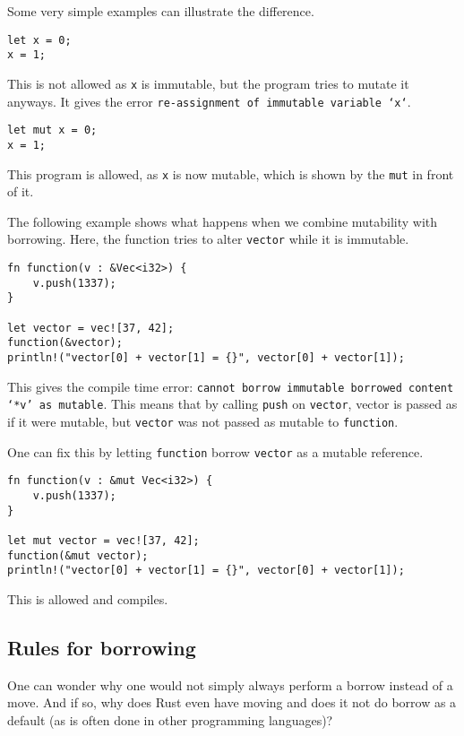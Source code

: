 Some very simple examples can illustrate the difference.

\begin{verbatim}
let x = 0;
x = 1;
\end{verbatim}
This is not allowed as \verb|x| is immutable, but the program tries to mutate it anyways. It gives the error \texttt{re-assignment of immutable variable `x`}.

\begin{verbatim}
let mut x = 0;
x = 1;
\end{verbatim}
This program is allowed, as \verb|x| is now mutable, which is shown by the \verb|mut| in front of it. 

The following example shows what happens when we combine mutability with borrowing. Here, the function tries to alter \verb|vector| while it is immutable. 

\begin{verbatim}
fn function(v : &Vec<i32>) {
    v.push(1337);
}

let vector = vec![37, 42];
function(&vector);
println!("vector[0] + vector[1] = {}", vector[0] + vector[1]);
\end{verbatim}

This gives the compile time error: \texttt{cannot borrow immutable borrowed content `*v' as mutable}. This means that by calling \verb|push| on \verb|vector|, vector is passed as if it were mutable, but \verb|vector| was not passed as mutable to \verb|function|. 

One can fix this by letting \verb|function| borrow \verb|vector| as a mutable reference. 

\begin{verbatim}
fn function(v : &mut Vec<i32>) {
    v.push(1337);
}

let mut vector = vec![37, 42];
function(&mut vector);
println!("vector[0] + vector[1] = {}", vector[0] + vector[1]);
\end{verbatim}

This is allowed and compiles. 

\subsection{Rules for borrowing}
One can wonder why one would not simply always perform a borrow instead of a move. And if so, why does Rust even have moving and does it not do borrow as a default (as is often done in other programming languages)? 

